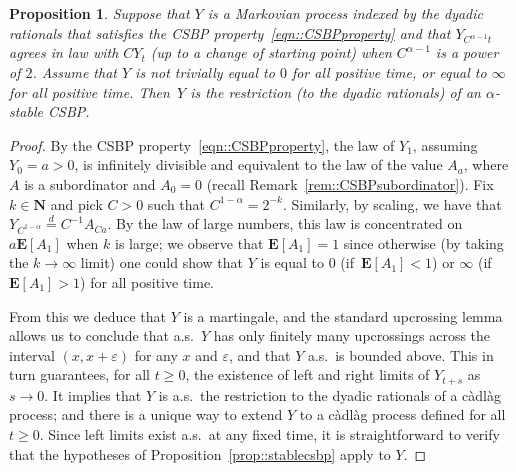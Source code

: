 \documentclass[JEP,XML,SOM,Unicode]{cedram}
\let\epsilon\varepsilon
\theoremstyle{plain}
\numberwithin{theorem}{section}
\newtheorem{proposition}[theorem]{Proposition}
\theoremstyle{definition}
\newcommand \E {{\mathbf E}}
\newcommand{\N}{\mathbf{N}}
\newcommand{\cadlag}{càdlàg}
\begin{document}
\begin{proposition}
\label{prop::strongstablecsbp}
Suppose that $Y$ is a Markovian process indexed by the dyadic rationals that satisfies the CSBP property~\eqref{eqn::CSBPproperty} and that $Y_{C^{\alpha-1} t}$ agrees in law with $C Y_t$ (up to a change of starting point) when $C^{\alpha-1}$ is a power of $2$. Assume that $Y$ is not trivially equal to $0$ for all positive time, or equal to $\infty$ for all positive time. Then~$Y$ is the restriction (to the dyadic rationals) of an $\alpha$-stable CSBP.
\end{proposition}
\begin{proof}
By the CSBP property~\eqref{eqn::CSBPproperty}, the law of $Y_1$, assuming $Y_0 = a > 0$, is infinitely divisible and equivalent to the law of the value $A_a$, where $A$ is a subordinator and $A_0 = 0$ (recall Remark~\ref{rem::CSBPsubordinator}). Fix $k \in \N$ and pick $C > 0$ such that $C^{1-\alpha} = 2^{-k}$. Similarly, by scaling, we have that $Y_{C^{1-\alpha}} \stackrel{d}{=} C^{-1}A_{Ca}$. By the law of large numbers, this law is concentrated on $a \E[A_1]$ when $k$ is large; we observe that $\E[A_1] = 1$ since otherwise (by taking the $k \to \infty$ limit) one could show that $Y$ is equal to $0$ (if~$\E[A_1] < 1$) or $\infty$ (if $\E[A_1] > 1$) for all positive time.

From this we deduce that $Y$ is a martingale, and the standard upcrossing lemma allows us to conclude that a.s.\ $Y$ has only finitely many upcrossings across the interval $(x, x+\epsilon)$ for any $x$ and $\epsilon$, and that $Y$ a.s.\ is bounded above. This in turn guarantees, for all $t \geq 0$, the existence of left and right limits of $Y_{t+s}$ as $s \to 0$. It implies that $Y$ is a.s.\ the restriction to the dyadic rationals of a {\cadlag} process; and there is a unique way to extend $Y$ to a {\cadlag} process defined for all $t \geq 0$. Since left limits exist a.s.\ at any fixed time, it is straightforward to verify that the hypotheses of Proposition~\ref{prop::stablecsbp} apply to $Y$.
\end{proof}
\end{document}
